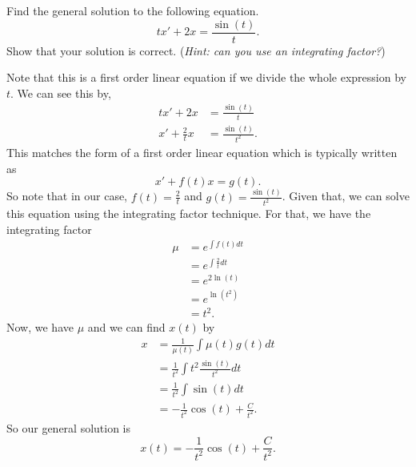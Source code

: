 \documentclass[12pt]{article} %
\begin{document}
\newpage
\begin{problem}
Find the general solution to the following equation.
\[
tx'+2x=\frac{\sin(t)}{t}.
\]
Show that your solution is correct. (\emph{Hint: can you use an integrating factor?})
\end{problem}
\begin{solution}
Note that this is a first order linear equation if we divide the whole expression by $t$. We can see this by,
\begin{align*}
    tx'+2x&=\frac{\sin(t)}{t}\\
    x'+\frac{2}{t}x&=\frac{\sin(t)}{t^2}.
\end{align*}
This matches the form of a first order linear equation which is typically written as
\[
x'+f(t)x=g(t).
\]
So note that in our case, $f(t)=\frac{2}{t}$ and $g(t)=\frac{\sin(t)}{t^2}$. Given that, we can solve this equation using the integrating factor technique.  For that, we have the integrating factor
\begin{align*}
\mu &= e^{\int f(t)dt}\\
&=e^{\int \frac{2}{t}dt}\\
&= e^{2\ln(t)}\\
&=e^{\ln\left(t^2\right)}\\
&=t^2.
\end{align*}
Now, we have $\mu$ and we can find $x(t)$ by
\begin{align*}
    x&= \frac{1}{\mu(t)}\int \mu(t)g(t)dt\\
    &= \frac{1}{t^2} \int t^2 \frac{\sin(t)}{t^2}dt\\
    &= \frac{1}{t^2}\int \sin(t)dt\\
    &= -\frac{1}{t^2} \cos(t)+\frac{C}{t^2}.
\end{align*}
So our general solution is
\[
\boxed{x(t)=-\frac{1}{t^2}\cos(t)+\frac{C}{t^2}.}
\]
\end{solution}
\end{document}

